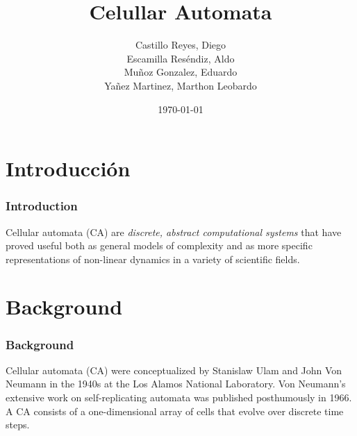 \documentclass{beamer}
\title{Celullar Automata}
\author{Castillo Reyes, Diego\\
        Escamilla Reséndiz, Aldo\\
        Muñoz Gonzalez, Eduardo\\
        Yañez Martinez, Marthon Leobardo\\}
\date{\today}
\begin{document}
\begin{frame}[plain]
    \titlepage
\end{frame}

\section{Introducción}
\begin{frame}
    \frametitle{Introduction}
    Cellular automata (CA) are \textit{discrete, abstract computational systems} that have proved useful both as general models of complexity and as more specific representations of non-linear dynamics in a variety of scientific fields.
\end{frame}

\section{Background}
\begin{frame}
    \frametitle{Background}
    Cellular automata (CA) were conceptualized by Stanislaw Ulam and John Von Neumann in the 1940s at the Los Alamos National Laboratory. Von Neumann's extensive work on self-replicating automata was published posthumously in 1966. A CA consists of a one-dimensional array of cells that evolve over discrete time steps.
\end{frame}
\end{document}
